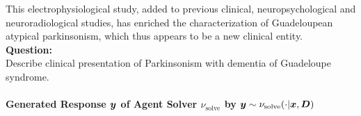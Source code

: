 \documentclass[10pt, a4paper, logo]{googledeepmind} %
\begin{document}
\begin{tcolorbox}
\begin{flushleft}
This electrophysiological study, added to previous clinical, neuropsychological and neuroradiological studies, has enriched the characterization of Guadeloupean atypical parkinsonism, which thus appears to be a new clinical entity.
\\
\vspace{1em}
\textbf{Question:}\\
Describe clinical presentation of Parkinsonism with dementia of Guadeloupe syndrome.
\end{flushleft}
\end{tcolorbox}

\paragraph{Generated Response ${\bm{y}}$ of Agent Solver $\nu_\text{solve}$ by ${\bm{y}}\sim\nu_\text{solve}(\cdot|{\bm{x}},{\bm{D}})$}
\end{document}
